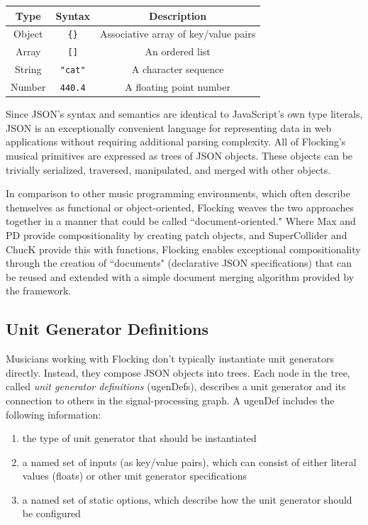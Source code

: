 \documentclass{article}
\begin{document}
\begin{tabular}{| c || c | c |}
    \hline
    \bf{Type} & \bf{Syntax} & \bf{Description} \\ \hline
    Object & \verb|{}| & Associative array of key/value pairs \\ \hline
    Array & \verb|[]| & An ordered list \\ \hline
    String & \verb|"cat"| & A character sequence \\ \hline
    Number & \verb|440.4| & A floating point number \\ \hline
\end{tabular}

Since JSON's syntax and semantics are identical to JavaScript's own type literals, JSON is an exceptionally convenient language for representing data in web applications without requiring additional parsing complexity. All of Flocking's musical primitives are expressed as trees of JSON objects. These objects can be trivially serialized, traversed, manipulated, and merged with other objects.

In comparison to other music programming environments, which often describe themselves as functional or object-oriented, Flocking weaves the two approaches together in a manner that could be called ``document-oriented." Where Max and PD provide compositionality by creating patch objects, and SuperCollider and ChucK provide this with functions, Flocking enables exceptional compositionality through the creation of ``documents" (declarative JSON specifications) that can be reused and extended with a simple document merging algorithm provided by the framework.

\subsection{Unit Generator Definitions}

Musicians working with Flocking don't typically instantiate unit generators directly. Instead, they compose JSON objects into trees. Each node in the tree, called {\it unit generator definitions} (ugenDefs), describes a unit generator and its connection to others in the signal-processing graph. A ugenDef includes the following information:

\begin{enumerate}
\item the type of unit generator that should be instantiated
\item a named set of inputs (as key/value pairs), which can consist of either literal values (floats) or other unit generator specifications
\item a named set of static options, which describe how the unit generator should be configured
\end{enumerate}
\end{document}
